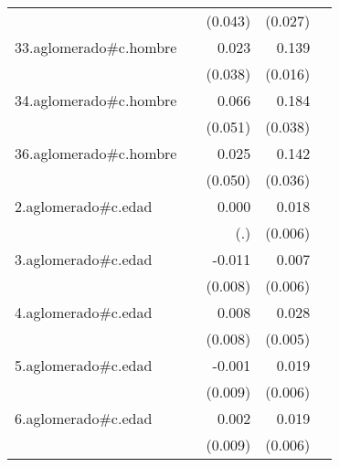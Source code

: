 {\begin{longtable}{l*{4}{D{.}{.}{-1}}}
            &                     &     (0.043)         &     (0.027)         &                     \\
\addlinespace
33.aglomerado#c.hombre&                     &       0.023         &       0.139\sym{***}&                     \\
            &                     &     (0.038)         &     (0.016)         &                     \\
\addlinespace
34.aglomerado#c.hombre&                     &       0.066         &       0.184\sym{***}&                     \\
            &                     &     (0.051)         &     (0.038)         &                     \\
\addlinespace
36.aglomerado#c.hombre&                     &       0.025         &       0.142\sym{***}&                     \\
            &                     &     (0.050)         &     (0.036)         &                     \\
\addlinespace
2.aglomerado#c.edad&                     &       0.000         &       0.018\sym{**} &                     \\
            &                     &         (.)         &     (0.006)         &                     \\
\addlinespace
3.aglomerado#c.edad&                     &      -0.011         &       0.007         &                     \\
            &                     &     (0.008)         &     (0.006)         &                     \\
\addlinespace
4.aglomerado#c.edad&                     &       0.008         &       0.028\sym{***}&                     \\
            &                     &     (0.008)         &     (0.005)         &                     \\
\addlinespace
5.aglomerado#c.edad&                     &      -0.001         &       0.019\sym{***}&                     \\
            &                     &     (0.009)         &     (0.006)         &                     \\
\addlinespace
6.aglomerado#c.edad&                     &       0.002         &       0.019\sym{**} &                     \\
            &                     &     (0.009)         &     (0.006)         &                     \\

\end{longtable}}
